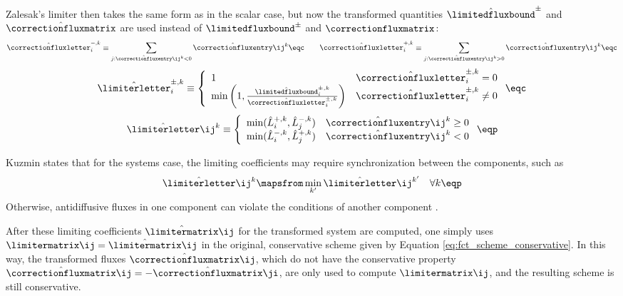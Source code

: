 Zalesak's limiter then takes the same form as in the scalar case, but
now the transformed quantities $\hat{\mathbf{\limitedfluxbound}}^\pm$
and $\hat{\correctionfluxmatrix}$ are used instead of
$\mathbf{\limitedfluxbound}^\pm$ and $\correctionfluxmatrix$:
\begin{equation}
  \hat{\correctionfluxletter}_i^{-,k} \equiv
    \sum\limits_{j:\hat{\correctionfluxentry}\ij^k<0}
    \hat{\correctionfluxentry}\ij^k \eqc \qquad
  \hat{\correctionfluxletter}_i^{+,k} \equiv
    \sum\limits_{j:\hat{\correctionfluxentry}\ij^k>0}
    \hat{\correctionfluxentry}\ij^k \eqc
\end{equation}
\begin{equation}
  \hat{\limiterletter}_i^{\pm,k} \equiv\left\{
    \begin{array}{l l}
      1 & \hat{\correctionfluxletter}_i^{\pm,k} = 0\\
      \min\left(1,\frac{\hat{\limitedfluxbound}_i^{\pm,k}}
        {\hat{\correctionfluxletter}_i^{\pm,k}}\right) &
      \hat{\correctionfluxletter}_i^{\pm,k} \ne 0
    \end{array}
  \right. \eqc
\end{equation}
\begin{equation}
  \hat{\limiterletter}\ij^k \equiv\left\{
    \begin{array}{l l}
      \min(\hat{L}_i^{+,k},\hat{L}_j^{-,k}) &
        \hat{\correctionfluxentry}\ij^k \geq 0\\
      \min(\hat{L}_i^{-,k},\hat{L}_j^{+,k}) &
        \hat{\correctionfluxentry}\ij^k < 0
    \end{array}
  \right. \eqp
\end{equation}

Kuzmin states that for the systems case, the limiting coefficients may require
synchronization between the components, such as
\begin{equation}
  \hat{\limiterletter}\ij^k \mapsfrom
    \min\limits_{k'}\hat{\limiterletter}\ij^{k'} \quad \forall k \eqp
\end{equation}
Otherwise, antidiffusive fluxes in one component can violate the
conditions of another component \cite{kuzmin_FCT}.

After these limiting coefficients $\hat{\limitermatrix}\ij$ for the transformed
system are computed, one simply uses $\limitermatrix\ij=\hat{\limitermatrix}\ij$
in the original, conservative scheme given by Equation \eqref{eq:fct_scheme_conservative}.
In this way, the transformed fluxes $\hat{\correctionfluxmatrix}\ij$,
which do not have the conservative property
$\hat{\correctionfluxmatrix}\ij = -\hat{\correctionfluxmatrix}\ji$,
are only used to compute $\limitermatrix\ij$,
and the resulting scheme is still conservative.
